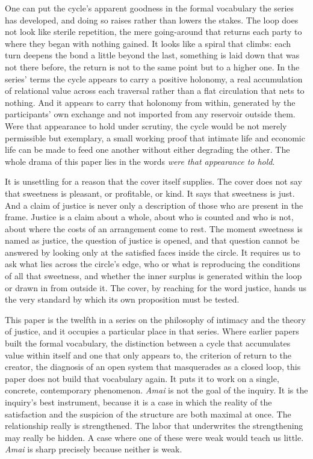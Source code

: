 One can put the cycle's apparent goodness in the formal vocabulary the series has developed, and doing so raises rather than lowers the stakes. The loop does not look like sterile repetition, the mere going-around that returns each party to where they began with nothing gained. It looks like a spiral that climbs: each turn deepens the bond a little beyond the last, something is laid down that was not there before, the return is not to the same point but to a higher one. In the series' terms the cycle appears to carry a positive holonomy, a real accumulation of relational value across each traversal rather than a flat circulation that nets to nothing. And it appears to carry that holonomy from within, generated by the participants' own exchange and not imported from any reservoir outside them. Were that appearance to hold under scrutiny, the cycle would be not merely permissible but exemplary, a small working proof that intimate life and economic life can be made to feed one another without either degrading the other. The whole drama of this paper lies in the words \textit{were that appearance to hold}.

It is unsettling for a reason that the cover itself supplies. The cover does not say that sweetness is pleasant, or profitable, or kind. It says that sweetness is just. And a claim of justice is never only a description of those who are present in the frame. Justice is a claim about a whole, about who is counted and who is not, about where the costs of an arrangement come to rest. The moment sweetness is named as justice, the question of justice is opened, and that question cannot be answered by looking only at the satisfied faces inside the circle. It requires us to ask what lies across the circle's edge, who or what is reproducing the conditions of all that sweetness, and whether the inner surplus is generated within the loop or drawn in from outside it. The cover, by reaching for the word justice, hands us the very standard by which its own proposition must be tested.

This paper is the twelfth in a series on the philosophy of intimacy and the theory of justice, and it occupies a particular place in that series. Where earlier papers built the formal vocabulary, the distinction between a cycle that accumulates value within itself and one that only appears to, the criterion of return to the creator, the diagnosis of an open system that masquerades as a closed loop, this paper does not build that vocabulary again. It puts it to work on a single, concrete, contemporary phenomenon. \textit{Amai} is not the goal of the inquiry. It is the inquiry's best instrument, because it is a case in which the reality of the satisfaction and the suspicion of the structure are both maximal at once. The relationship really is strengthened. The labor that underwrites the strengthening may really be hidden. A case where one of these were weak would teach us little. \textit{Amai} is sharp precisely because neither is weak.

